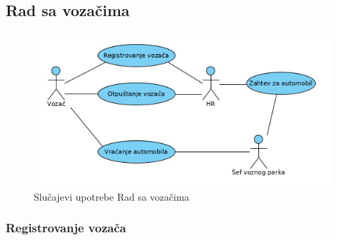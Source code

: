 \subsection{\bfseries Rad sa vozačima}

\begin{figure}[H]
\begin{center}
\includegraphics[width=\textwidth]{Slike/RadSaVozacimaUseCase.png}
\end{center}
    \caption{Slučajevi upotrebe Rad sa vozačima}
\label{fig:contextDiagram}
\end{figure}

\subsubsection{\bfseries Registrovanje vozača}

